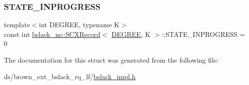 \mbox{\label{structbslack__ns_1_1SCXRecord_a9c79774eb447ccf468b1422272ed17ef}} 
\subsubsection{\texorpdfstring{S\+T\+A\+T\+E\+\_\+\+I\+N\+P\+R\+O\+G\+R\+E\+SS}{STATE\_INPROGRESS}}
{\footnotesize\ttfamily template$<$int D\+E\+G\+R\+EE, typename K$>$ \\
const int \hyperlink{structbslack__ns_1_1SCXRecord}{bslack\+\_\+ns\+::\+S\+C\+X\+Record}$<$ \hyperlink{brown__sigouin__abtree__kcas_2adapter_8h_a5d88b17d70c985f2f2b8e987037fd6dd}{D\+E\+G\+R\+EE}, K $>$\+::S\+T\+A\+T\+E\+\_\+\+I\+N\+P\+R\+O\+G\+R\+E\+SS = 0\hspace{0.3cm}{\ttfamily [static]}}



The documentation for this struct was generated from the following file\+:\begin{DoxyCompactItemize}
\item 
ds/brown\+\_\+ext\+\_\+bslack\+\_\+rq\+\_\+lf/\hyperlink{bslack__impl_8h}{bslack\+\_\+impl.\+h}\end{DoxyCompactItemize}
